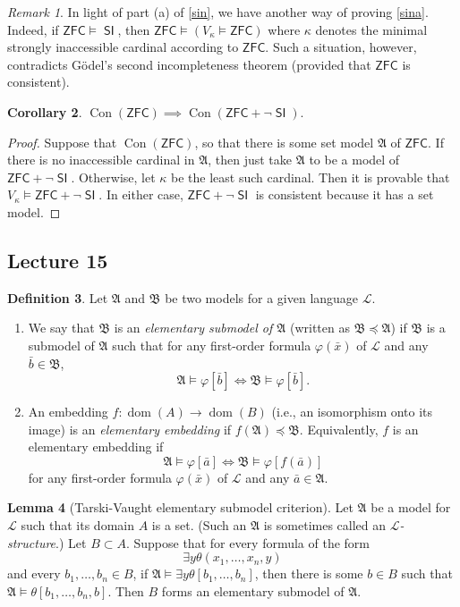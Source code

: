 \documentclass[10pt,letterpaper,cm]{nupset}
\theoremstyle{definition}
\newtheorem{definition}{Definition}[subsection]
\theoremstyle{theorem}
\newtheorem{lemma}[definition]{Lemma}
\newtheorem{corollary}[definition]{Corollary}
\theoremstyle{remark}
\newtheorem{remark}[definition]{Remark}
\newcommand{\A}{\mathfrak A}
\renewcommand{\L}{\mathcal L}
\newcommand{\B}{\mathfrak{B}}
\newcommand{\1}{\mathbf{1}}
\newcommand{\0}{\vec 0}
\newcommand{\zfc}{\mathsf{ZFC}}
\DeclareMathOperator{\dom}{dom}
\DeclareMathOperator{\si}{\mathsf{SI}}
\DeclareMathOperator{\con}{Con}
\newcommand{\be}{\begin{enumerate}}
\newcommand{\ee}{\end{enumerate}}
\begin{document}
\begin{remark}
In light of part (a) of \cref{sin}, we have another way of proving \cref{sina}. Indeed, if $\zfc \models \si$, then $\zfc \models \left(V_{\kappa} \models \zfc\right)$ where $\kappa$ denotes the minimal strongly inaccessible cardinal according to $\zfc$. Such a situation, however, contradicts G\"odel's second incompleteness theorem (provided that $\zfc$ is consistent). 
\end{remark}

\begin{corollary}
$\con(\zfc) \implies \con(\zfc + \neg{\si})$.
\end{corollary}
\begin{proof}
Suppose that $\con(\zfc)$, so that there is some set model $\A$ of $\zfc$. If there is no inaccessible cardinal in $\A$, then just take $\A$ to be a model of $\zfc + \neg{\si}$. Otherwise, let $\kappa$ be the least such cardinal. Then it is provable that $V_{\kappa} \models \zfc + \neg{\si}$. In either case, $\zfc + \neg{\si}$ is consistent because it has a set model.
\end{proof}


\subsection{Lecture 15}

\begin{definition} Let $\A$ and $\B$ be two models for a given language $\L$.
\be 
\item We say that $\B$ is an \textit{elementary submodel of $\A$} (written as $\B \preceq \A$) if $\B$ is a submodel of $\A$ such that for any first-order formula $\varphi(\bar{x})$ of $\L$ and any $\bar{b} \in \B$,
\[
\A \models \varphi[\bar{b}] \iff \B \models \varphi[\bar{b}]
.\]
\item An embedding $f : \dom(A) \to \dom(B)$ (i.e., an isomorphism onto its image)  is an \textit{elementary embedding} if $f(\A) \preceq \B$. Equivalently, $f$ is an elementary embedding if $$ \A \models \varphi[\bar{a}] \iff  \B \models \varphi[f(\bar{a})]    $$ for any  first-order formula $\varphi(\bar{x})$ of $\L$ and any $\bar{a} \in \A$.
\ee
\end{definition}


\begin{lemma}[Tarski-Vaught elementary submodel criterion]\label{TV}
Let $\A$ be a model for $\L$ such that its domain $A$ is a set. (Such an $\A$ is sometimes called an \textit{$\L$-structure}.) Let $B \subset A$. Suppose that for every formula of the form $$\exists y \theta(x_1, \ldots, x_n, y)$$ and every $b_1, \ldots, b_n \in B$, if $\A \models \exists y \theta[b_1, \ldots, b_n]$, then there is some $b \in B$ such that $\A \models \theta[b_1, \ldots, b_n, b]$.
Then $B$ forms an elementary submodel of $\A$. 
\end{lemma}
\end{document}
